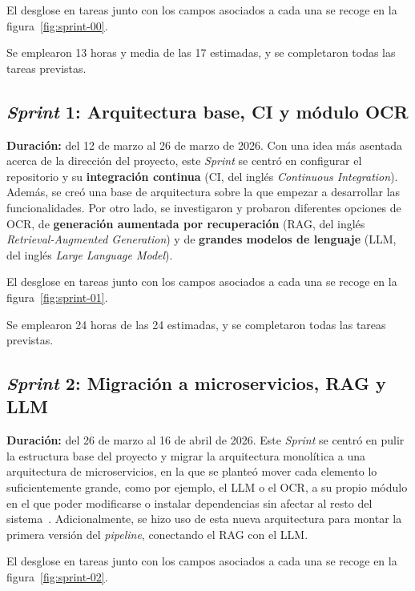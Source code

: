 El desglose en tareas junto con los campos asociados a cada una se
recoge en la figura~\ref{fig:sprint-00}.


Se emplearon 13 horas y media de las 17 estimadas, y se completaron todas las
tareas previstas.

\subsection{\textit{Sprint} 1: Arquitectura base, CI y módulo OCR}
\textbf{Duración:} del 12 de marzo al 26 de marzo de 2026.
Con una idea más asentada acerca de la dirección del proyecto, este \textit{Sprint}
se centró en configurar el repositorio y su \textbf{integración continua} (CI, del
inglés \textit{Continuous Integration}). Además, se creó una base de
arquitectura sobre la que empezar a desarrollar las funcionalidades.
Por otro lado, se investigaron y probaron diferentes opciones de \ac{OCR}, de
\textbf{generación aumentada por recuperación}
(\acs{RAG}, del inglés \textit{Retrieval-Augmented Generation})
y de \textbf{grandes modelos de lenguaje}
(\acs{LLM}, del inglés \textit{Large Language Model}).

El desglose en tareas junto con los campos asociados a cada una se
recoge en la figura~\ref{fig:sprint-01}.


Se emplearon 24 horas de las 24 estimadas, y se completaron todas las
tareas previstas.

\subsection{\textit{Sprint} 2: Migración a microservicios, RAG y LLM}
\textbf{Duración:} del 26 de marzo al 16 de abril de 2026.
Este \textit{Sprint} se centró en pulir la estructura base del proyecto
y migrar la arquitectura monolítica a una arquitectura de
microservicios, en la que se planteó mover cada elemento lo
suficientemente grande, como por ejemplo, el \ac{LLM} o el \ac{OCR},
a su propio módulo en el que poder modificarse o instalar dependencias
sin afectar al resto del sistema~\cite{fowler_microservices}.
Adicionalmente, se hizo uso de esta nueva arquitectura para montar la
primera versión del \textit{pipeline}, conectando el \ac{RAG} con el \ac{LLM}.

El desglose en tareas junto con los campos asociados a cada una se
recoge en la figura~\ref{fig:sprint-02}.

